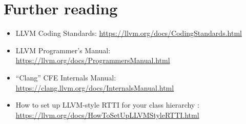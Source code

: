 \section{Further reading}
\begin{itemize}
\item LLVM Coding Standards\citep{llvm:coding_standards}: \href{https://llvm.org/docs/CodingStandards.html}{https://llvm.org/docs/CodingStandards.html}
\item LLVM Programmer’s Manual\citep{llvm:programmer_manual}: \href{https://llvm.org/docs/ProgrammersManual.html}{https://llvm.org/docs/ProgrammersManual.html}
\item “Clang” CFE Internals Manual\citep{llvm:clang_cfe_internals_manual}:
  \href{https://clang.llvm.org/docs/InternalsManual.html}{https://clang.llvm.org/docs/InternalsManual.html}
\item How to set up LLVM-style RTTI for your class hierarchy \citep{llvm:rtti_setup}: \\
  \href{https://llvm.org/docs/HowToSetUpLLVMStyleRTTI.html}{https://llvm.org/docs/HowToSetUpLLVMStyleRTTI.html}
\end{itemize}

